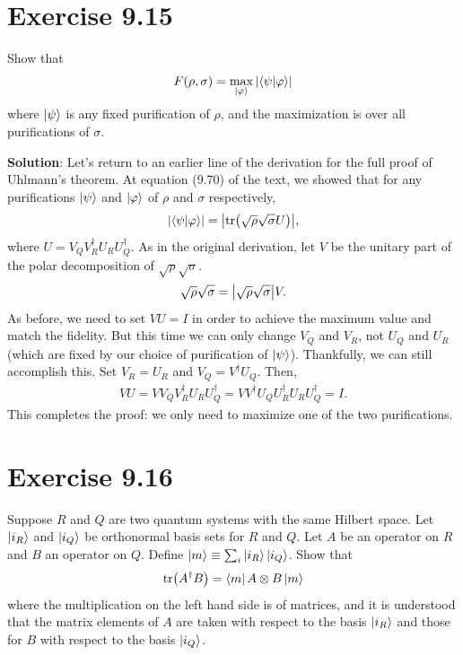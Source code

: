 \documentclass{book}
\begin{document}
\section*{Exercise 9.15}
    Show that
    \begin{align}
        F(\rho, \sigma) = \max_{\ket{\varphi}} \abs{\bra{\psi}\ket{\varphi}}
    \end{align}
    where $\ket{\psi}$ is any fixed purification of $\rho$, and the maximization is over all purifications of $\sigma$.
    
    \textbf{Solution}: Let's return to an earlier line of the derivation for the full proof of Uhlmann's theorem. At equation (9.70) of the text, we showed that for any purifications $\ket{\psi}$ and $\ket{\varphi}$ of $\rho$ and $\sigma$ respectively,
    \begin{align}
        \abs{\bra{\psi}\ket{\varphi}} = \abs{\tr(\sqrt{\rho}\sqrt{\sigma}U)},
    \end{align}
    where $U = V_Q V_R^\dagger U_R U_Q^\dagger$. As in the original derivation, let $V$ be the unitary part of the polar decomposition of $\sqrt{\rho}\sqrt{\sigma}$.
    \begin{align}
        \sqrt{\rho}\sqrt{\sigma} = \abs{\sqrt{\rho}\sqrt{\sigma}} V.
    \end{align}
    As before, we need to set $VU=I$ in order to achieve the maximum value and match the fidelity. But this time we can only change $V_Q$ and $V_R$, not $U_Q$ and $U_R$ (which are fixed by our choice of purification of $\ket{\psi}$). Thankfully, we can still accomplish this. Set $V_R = U_R$ and $V_Q = V^\dagger U_Q$. Then,
    \begin{align}
        VU = V V_Q V_R^\dagger U_R U_Q^\dagger = V V^\dagger U_Q U_R^\dagger U_R U_Q^\dagger = I.
    \end{align}
    This completes the proof: we only need to maximize one of the two purifications.
    
\section*{Exercise 9.16}
    Suppose $R$ and $Q$ are two quantum systems with the same Hilbert space. Let $\ket{i_R}$ and $\ket{i_Q}$ be orthonormal basis sets for $R$ and $Q$. Let $A$ be an operator on $R$ and $B$ an operator on $Q$. Define $\ket{m} \equiv \sum_i \ket{i_R}\ket{i_Q}$. Show that
    \begin{align}
        \tr(A^\dagger B) = \bra{m} A \otimes B \ket{m}
    \end{align}
    where the multiplication on the left hand side is of matrices, and it is understood that the matrix elements of $A$ are taken with respect to the basis $\ket{i_R}$ and those for $B$ with respect to the basis $\ket{i_Q}$.
    
\end{document}

